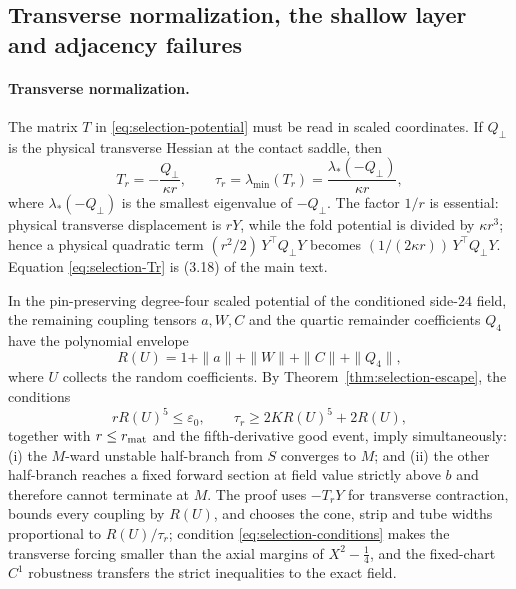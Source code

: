 \subsection{Transverse normalization, the shallow layer and adjacency failures}\label{ssec:selection-adjacency}

\paragraph{Transverse normalization.} The matrix $T$ in \eqref{eq:selection-potential} must be read in scaled coordinates. If $Q_\perp$ is the physical transverse Hessian at the contact saddle, then
\begin{equation}\label{eq:selection-Tr}
T_r=-\frac{Q_\perp}{\kappa r},\qquad\tau_r=\lambda_{\min}(T_r)=\frac{\lambda_*(-Q_\perp)}{\kappa r},
\end{equation}
where $\lambda_*(-Q_\perp)$ is the smallest eigenvalue of $-Q_\perp$. The factor $1/r$ is essential: physical transverse displacement is $rY$, while the fold potential is divided by $\kappa r^3$; hence a physical quadratic term $(r^2/2)\,Y^{\top}Q_\perp Y$ becomes $(1/(2\kappa r))\,Y^{\top}Q_\perp Y$. Equation \eqref{eq:selection-Tr} is (3.18) of the main text.

In the pin-preserving degree-four scaled potential of the conditioned side-$24$ field, the remaining coupling tensors $a,W,C$ and the quartic remainder coefficients $Q_4$ have the polynomial envelope
\begin{equation}\label{eq:selection-RU}
R(U)=1+\|a\|+\|W\|+\|C\|+\|Q_4\|,
\end{equation}
where $U$ collects the random coefficients. By Theorem~\ref{thm:selection-escape}, the conditions
\begin{equation}\label{eq:selection-conditions}
rR(U)^5\le\varepsilon_0,\qquad\tau_r\ge2KR(U)^5+2R(U),
\end{equation}
together with $r\le r_{\rm mat}$ and the fifth-derivative good event, imply simultaneously: (i) the $M$-ward unstable half-branch from $S$ converges to $M$; and (ii) the other half-branch reaches a fixed forward section at field value strictly above $b$ and therefore cannot terminate at $M$. The proof uses $-T_rY$ for transverse contraction, bounds every coupling by $R(U)$, and chooses the cone, strip and tube widths proportional to $R(U)/\tau_r$; condition \eqref{eq:selection-conditions} makes the transverse forcing smaller than the axial margins of $X^2-\frac14$, and the fixed-chart $C^1$ robustness transfers the strict inequalities to the exact field.

